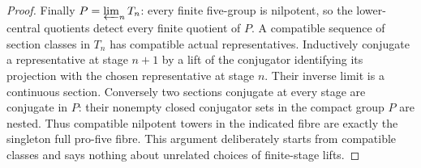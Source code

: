 \begin{proof}
Finally \(P=\varprojlim_n T_n\): every
finite five-group is nilpotent, so the
lower-central quotients detect every
finite quotient of \(P\). A compatible
sequence of section classes in \(T_n\)
has compatible actual representatives.
Inductively conjugate a representative
at stage \(n+1\) by a lift of the
conjugator identifying its projection
with the chosen representative at stage
\(n\). Their inverse limit is a
continuous section. Conversely two
sections conjugate at every stage are
conjugate in \(P\): their nonempty
closed conjugator sets in the compact
group \(P\) are nested. Thus compatible
nilpotent towers in the indicated fibre
are exactly the singleton full pro-five
fibre. This argument deliberately starts
from compatible classes and says nothing
about unrelated choices of finite-stage
lifts.
\end{proof}
